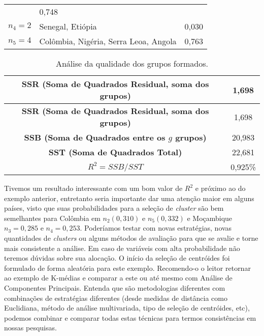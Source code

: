 \documentclass[
  openany]{book}
\begin{document}
\begin{longtable}[]{@{}lll@{}}
\begin{minipage}[t]{0.30\columnwidth}
\end{minipage} & \begin{minipage}[t]{0.30\columnwidth}\raggedright
0,748\strut
\end{minipage}\tabularnewline
\begin{minipage}[t]{0.30\columnwidth}\raggedright
\(n_4=2\)\strut
\end{minipage} & \begin{minipage}[t]{0.30\columnwidth}\raggedright
Senegal, Etiópia\strut
\end{minipage} & \begin{minipage}[t]{0.30\columnwidth}\raggedright
0,030\strut
\end{minipage}\tabularnewline
\begin{minipage}[t]{0.30\columnwidth}\raggedright
\(n_5=4\)\strut
\end{minipage} & \begin{minipage}[t]{0.30\columnwidth}\raggedright
Colômbia, Nigéria, Serra Leoa, Angola\strut
\end{minipage} & \begin{minipage}[t]{0.30\columnwidth}\raggedright
0,763\strut
\end{minipage}\tabularnewline
\bottomrule
\end{longtable}

\begin{longtable}[]{@{}cc@{}}
\caption{\label{tab:exkmeans2} Análise da qualidade dos grupos formados.}\tabularnewline
\toprule
\textbf{SSR (Soma de Quadrados Residual, soma dos grupos)} & 1,698\tabularnewline
\midrule
\endfirsthead
\toprule
\textbf{SSR (Soma de Quadrados Residual, soma dos grupos)} & 1,698\tabularnewline
\midrule
\endhead
\textbf{SSB (Soma de Quadrados entre os \(g\) grupos)} & 20,983\tabularnewline
\textbf{SST (Soma de Quadrados Total)} & 22,681\tabularnewline
\textbf{\(R^2=SSB/SST\)} & 0,925\%\tabularnewline
\bottomrule
\end{longtable}

Tivemos um resultado interessante com um bom valor de \(R^2\) e próximo ao do exemplo anterior, entretanto seria importante dar uma atenção maior em alguns países, visto que suas probabilidades para a seleção de \emph{cluster} são bem semelhantes para Colômbia em \(n_2 (0,310)\) e \(n_5 (0,332)\) e Moçambique \(n_3=0,285\) e \(n_4=0,253\). Poderíamos testar com novas estratégias, novas quantidades de \emph{clusters} ou alguns métodos de avaliação para que se avalie e torne mais consistente a análise. Em caso de variáveis com alta probabilidade não teremos dúvidas sobre sua alocação. O início da seleção de centróides foi formulado de forma aleatória para este exemplo. Recomendo-o o leitor retornar ao exemplo de K-médias e comparar a este ou até mesmo com Análise de Componentes Principais. Entenda que são metodologias diferentes com combinações de estratégias diferentes (desde medidas de distância como Euclidiana, método de análise multivariada, tipo de seleção de centróides, etc), podemos combinar e comparar todas estas técnicas para termos consistências em nossas pesquisas.
\end{document}

